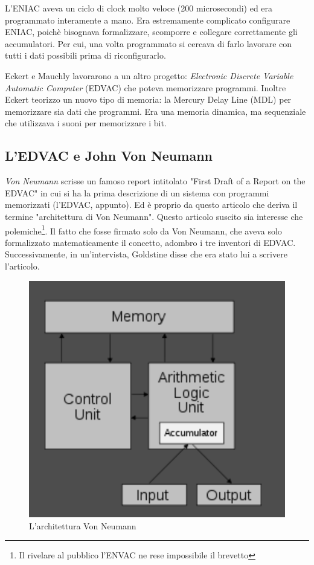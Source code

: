 L'ENIAC aveva un ciclo di clock molto veloce (200 microsecondi) ed era programmato interamente a mano. Era estremamente complicato configurare ENIAC, poichè bisognava formalizzare, scomporre e collegare correttamente gli accumulatori. Per cui, una volta programmato si cercava di farlo lavorare con tutti i dati possibili prima di riconfigurarlo.

Eckert e Mauchly lavorarono a un altro progetto: \textit{Electronic Discrete Variable Automatic Computer} (EDVAC) che poteva memorizzare programmi. Inoltre Eckert teorizzo un nuovo tipo di memoria: la Mercury Delay Line (MDL) per memorizzare sia dati che programmi. Era una memoria dinamica, ma sequenziale che utilizzava i suoni per memorizzare i bit.

\subsection{L'EDVAC e John Von Neumann}

\textit{Von Neumann} scrisse un famoso report intitolato "First Draft of a Report on the EDVAC" in cui si ha la prima descrizione di un sistema con programmi memorizzati (l'EDVAC, appunto). Ed è proprio da questo articolo che deriva il termine "architettura di Von Neumann". Questo articolo suscito sia interesse che polemiche\footnote{Il rivelare al pubblico l'ENVAC ne rese impossibile il brevetto}. Il fatto che fosse firmato solo da Von Neumann, che aveva solo formalizzato matematicamente il concetto, adombro i tre inventori di EDVAC. Successivamente, in un'intervista, Goldstine disse che era stato lui a scrivere l'articolo.

\begin{figure} [!h]
    \centering
    \includegraphics[scale = 0.3]{images/storia arch/Architettura Von Neumann.png}
    \caption{L'architettura Von Neumann}
    \label{fig:EDVAC}
\end{figure}

